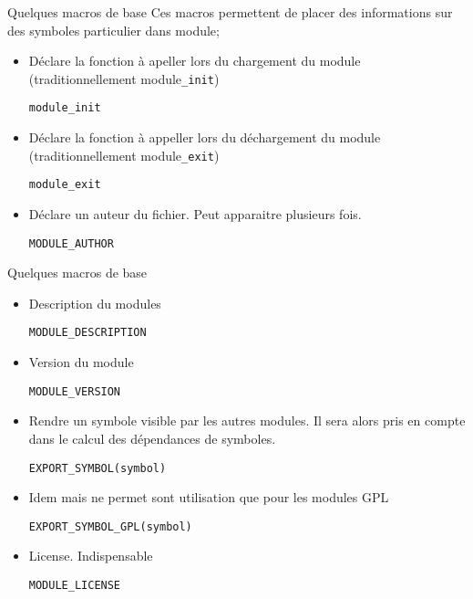 \begin{frame}[fragile=singleslide]{Quelques macros de base}
  Ces macros  permettent de placer  des informations sur  des symboles
  particulier dans module;
  \begin{itemize} 
  \item Déclare  la fonction  à apeller lors  du chargement  du module
  (traditionnellement module\texttt{\_init})
    \begin{lstlisting} 
module_init
    \end{lstlisting} 
  \item Déclare la fonction à  appeller lors du déchargement du module
  (traditionnellement module\texttt{\_exit})
    \begin{lstlisting} 
module_exit
    \end{lstlisting} 
  \item Déclare un auteur du fichier. Peut apparaitre plusieurs fois.
    \begin{lstlisting}
MODULE_AUTHOR
    \end{lstlisting}
  \end{itemize}
\end{frame}
\begin{frame}[fragile=singleslide]{Quelques macros de base}
  \begin{itemize} 
  \item Description du modules
    \begin{lstlisting}
MODULE_DESCRIPTION
    \end{lstlisting}
  \item Version du module
    \begin{lstlisting}
MODULE_VERSION
    \end{lstlisting}
  \item Rendre un symbole visible par les autres modules.  Il sera alors
    pris en compte dans le calcul des dépendances de symboles.
    \begin{lstlisting}
EXPORT_SYMBOL(symbol)
    \end{lstlisting} 
  \item Idem  mais  ne permet sont utilisation que
    pour les modules GPL
    \begin{lstlisting}
EXPORT_SYMBOL_GPL(symbol)
    \end{lstlisting} 
  \item License. Indispensable
    \begin{lstlisting}
MODULE_LICENSE
    \end{lstlisting}
  \end{itemize}
\end{frame}

